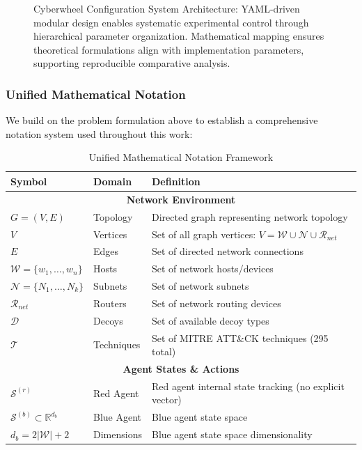 \documentclass[12pt,oneside]{article}
\begin{document}
\begin{figure}[H]
\caption{Cyberwheel Configuration System Architecture: YAML-driven modular design enables systematic experimental control through hierarchical parameter organization. Mathematical mapping ensures theoretical formulations align with implementation parameters, supporting reproducible comparative analysis.}
\end{figure}


\subsubsection{Unified Mathematical Notation}

We build on the problem formulation above to establish a comprehensive notation system used throughout this work:

\begin{table}[H]
\centering
\caption{Unified Mathematical Notation Framework}
\label{tab:unified_notation}
\small
\begin{tabular}{|l|l|p{6cm}|}
\hline
\textbf{Symbol} & \textbf{Domain} & \textbf{Definition} \\
\hline
\multicolumn{3}{|c|}{\textbf{Network Environment}} \\
\hline
$G = (V, E)$ & Topology & Directed graph representing network topology \\
$V$ & Vertices & Set of all graph vertices: $V = \mathcal{W} \cup \mathcal{N} \cup \mathcal{R}_{net}$ \\
$E$ & Edges & Set of directed network connections \\
$\mathcal{W} = \{w_1, \ldots, w_n\}$ & Hosts & Set of network hosts/devices \\
$\mathcal{N} = \{N_1, \ldots, N_k\}$ & Subnets & Set of network subnets \\
$\mathcal{R}_{net}$ & Routers & Set of network routing devices \\
$\mathcal{D}$ & Decoys & Set of available decoy types \\
$\mathcal{T}$ & Techniques & Set of MITRE ATT\&CK techniques (295 total) \\
\hline
\multicolumn{3}{|c|}{\textbf{Agent States \& Actions}} \\
\hline
$\mathcal{S}^{(r)}$ & Red Agent & Red agent internal state tracking (no explicit vector) \\
$\mathcal{S}^{(b)} \subset \mathbb{R}^{d_b}$ & Blue Agent & Blue agent state space \\
$d_b = 2|\mathcal{W}| + 2$ & Dimensions & Blue agent state space dimensionality \\

\end{tabular}
\end{table}
\end{document}
